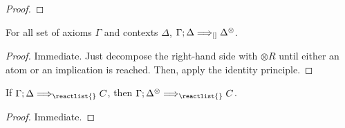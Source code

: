 \begin{proof}
\end{proof}

\begin{lemma}
  For all set of axioms $\Gamma$ and contexts $\Delta$,
  $\Gamma ; \Delta \Longrightarrow_{[]} \Delta^{\otimes}$.
\end{lemma}
\begin{proof}
  Immediate. Just decompose the right-hand side with $\otimes R$ until either an
  atom or an implication is reached. Then, apply the identity principle.
\end{proof}

\begin{lemma}
  If $\zsyseq{\Gamma}{\Delta}{\reactlist{}}{C}$, then
  $\zsyseq{\Gamma}{\Delta^{\otimes}}{\reactlist{}}{C}$.
\end{lemma}
\begin{proof}
  Immediate.
\end{proof}

